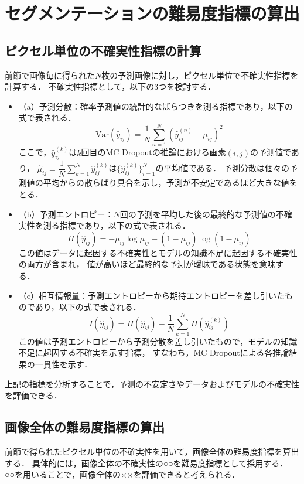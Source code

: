\documentclass[10pt, a4paper, twocolumn]{jarticle}
\begin{document}
\section{セグメンテーションの難易度指標の算出}

\subsection{ピクセル単位の不確実性指標の計算}
前節で画像毎に得られた$N$枚の予測画像に対し，ピクセル単位で不確実性指標を計算する．
不確実性指標として，以下の3つを検討する．

\begin{itemize}
  \item （a）予測分散：確率予測値の統計的なばらつきを測る指標であり，以下の式で表される．
  \begin{equation}
    \text{Var}(\hat{y}_{ij}) = \frac{1}{N} \sum_{n=1}^{N} (\hat{y}_{ij}^{(n)} - \mu_{ij})^2
  \end{equation}
  ここで，$\hat{y}_{ij}^{(k)}$は$k$回目のMC Dropoutの推論における画素$(i, j)$の予測値であり，
  $\hat{\mu}_{ij} = \dfrac{1}{N} \sum_{k = 1}^{N} \hat{y}_{ij} ^ {(k)}$は$\{\hat{y}_{ij} ^ {(k)}\}_{i = 1} ^ {N}$の平均値である．
  予測分散は個々の予測値の平均からの散らばり具合を示し，予測が不安定であるほど大きな値をとる．
  \item （b）予測エントロピー：$N$回の予測を平均した後の最終的な予測値の不確実性を測る指標であり，以下の式で表される．
  \begin{equation}
    H(\hat{y}_{ij}) = - \mu_{ij} \log{\mu_{ij}} - (1 - \mu_{ij}) \log{(1 - \mu_{ij})}
  \end{equation}
  この値はデータに起因する不確実性とモデルの知識不足に起因する不確実性の両方が含まれ，
  値が高いほど最終的な予測が曖昧である状態を意味する．
  \item （c）相互情報量：予測エントロピーから期待エントロピーを差し引いたものであり，以下の式で表される．
  \begin{equation}
    I(\hat{y}_{ij}) = H(\bar{\hat{y}}_{ij}) - \frac{1}{N}\sum_{k=1}^{N} H(\hat{y}_{ij}^{(k)})
  \end{equation}
  この値は予測エントロピーから予測分散を差し引いたもので，モデルの知識不足に起因する不確実を示す指標，
  すなわち，MC Dropoutによる各推論結果の一貫性を示す．
\end{itemize}

上記の指標を分析することで，予測の不安定さやデータおよびモデルの不確実性を評価できる．

\subsection{画像全体の難易度指標の算出}
前節で得られたピクセル単位の不確実性を用いて，画像全体の難易度指標を算出する．
具体的には，画像全体の不確実性の○○を難易度指標として採用する．
○○を用いることで，画像全体の××を評価できると考えられる．
\end{document}
